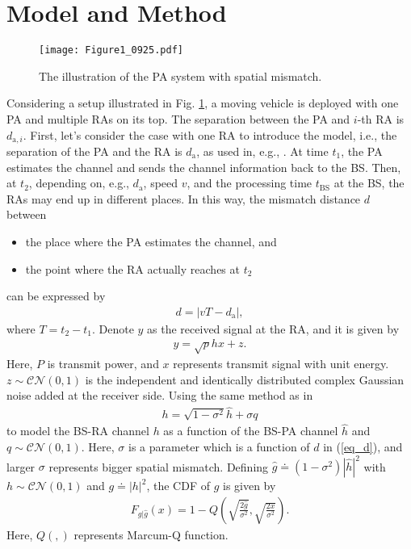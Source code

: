 \documentclass[conference]{IEEEtran}
\begin{document}
\section{Model and Method}
\begin{figure}
\centering
  \texttt{[image: Figure1\_0925.pdf]}\\
\caption{The illustration of the \ac{PA} system with spatial mismatch.}
\label{fig_1}
\end{figure}
Considering a setup illustrated in Fig. \ref{fig_1}, a moving vehicle is deployed with one \ac{PA} and multiple \acp{RA} on its top. The separation between the PA and $i$-th \ac{RA} is $d_{\text{a},i}$. First, let's consider the case with one \ac{RA} to introduce the model, i.e., the separation of the \ac{PA} and the \ac{RA} is $d_{\text{a}}$, as used in, e.g., \cite{guo2020semilinear}. At time $t_1$, the \ac{PA} estimates the channel and sends the channel information back to the \ac{BS}. Then, at $t_2$, depending on, e.g., $d_\text{a}$, speed $v$, and the processing time $t_{\text{BS}}$ at the \ac{BS}, the \acp{RA} may end up in different places. In this way, the mismatch distance $d$ between 
\begin{itemize}
    \item the place where the \ac{PA} estimates the channel, and
    \item the point where the \ac{RA} actually reaches at $t_2$
\end{itemize}
can be expressed by
\begin{align}\label{eq_d}
    d = |vT - d_{\text{a}}|,
\end{align}
where $T = t_2 - t_1$. Denote $y$ as the received signal at the \ac{RA}, and it is given by
\begin{align}\label{eq_Y}
y = \sqrt{p}hx + z.
\end{align}
Here, $P$ is transmit power, and $x$ represents transmit signal with unit energy. $z \sim \mathcal{CN}(0,1)$ is the independent and identically distributed complex Gaussian noise added at the receiver side. Using the same method as in \cite{guo2020semilinear} 
\begin{align}\label{eq_H}
    h = \sqrt{1-\sigma^2} \hat{h} + \sigma q
\end{align}
to model the \ac{BS}-\ac{RA} channel $h$ as a function of the \ac{BS}-\ac{PA} channel $\hat{h}$ and $q \sim \mathcal{CN}(0,1)$. Here, $\sigma$ is a parameter which is a function of $d$ in (\ref{eq_d}), and larger $\sigma$ represents bigger spatial mismatch.  Defining $\hat{g} \doteq (1-\sigma^2)|\hat{h}|^2$ with $h \sim \mathcal{CN}(0,1)$ and $ g \doteq |{h}|^2$, the CDF of $g$ is given by
\begin{align}\label{eq_cdf}
    F_{g|\hat{g}}(x) = 1 - Q\left( \sqrt{\frac{2\hat{g}}{\sigma^2}}, \sqrt{\frac{2x}{\sigma^2}}  \right).
\end{align}
Here, $Q(,)$ represents Marcum-Q function. 
\end{document}
